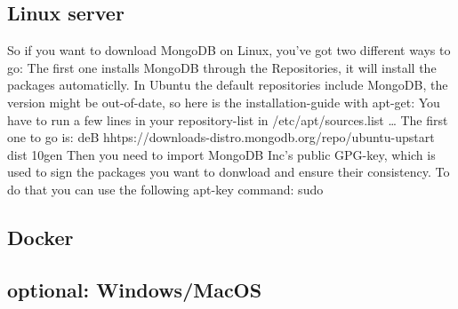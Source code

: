 \subsection{Linux server}
So if you want to download MongoDB on Linux, you've got two different ways to go:
The first one installs MongoDB through the Repositories, it will install the packages automaticlly. In Ubuntu the default repositories include MongoDB, the version might be out-of-date, so here is the installation-guide with apt-get:
You have to run a few lines in your repository-list in /etc/apt/sources.list \dots
The first one to go is: deB hhtps://downloads-distro.mongodb.org/repo/ubuntu-upstart dist 10gen
Then you need to import MongoDB Inc's public GPG-key, which is used to sign the packages you want to donwload and ensure their consistency. To do that you can use the following apt-key command: 
\dollar sudo 

\subsection{Docker}

\subsection{optional: Windows/MacOS}


\parencite{Mongo-Installation}

\parencite[p. ]{Subramanian2019}